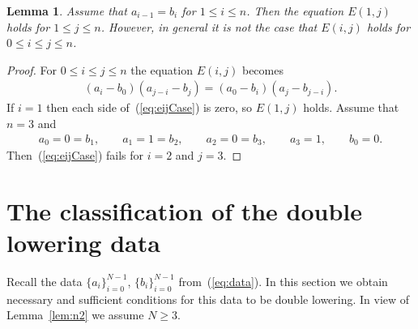 \documentclass[pdftex]{sigma}
\numberwithin{equation}{section}
\newtheorem{Lemma}[Theorem]{Lemma}
\begin{document}
\begin{Lemma}\label{lem:ce}
Assume that $a_{i-1}=b_i$ for $1 \leq i \leq n$.
Then the equation $E(1,j)$ holds for $1 \leq j \leq n$.
However, in general it is not the case that $E(i,j)$ holds
for $0 \leq i\leq j\leq n$.
\end{Lemma}
\begin{proof} For $0\leq i \leq j\leq n$ the equation
$E(i,j)$ becomes
\begin{gather}
(a_i-b_0)(a_{j-i}-b_j) =
(a_0-b_i)(a_{j}-b_{j-i}).
\label{eq:eijCase}
\end{gather}
If $i=1$ then each side of~(\ref{eq:eijCase}) is zero,
so $E(1,j)$ holds.
Assume that $n=3$ and
\begin{gather*}
a_0=0=b_1, \qquad a_1=1=b_2, \qquad a_2=0=b_3,\qquad a_3=1, \qquad b_0=0.
\end{gather*}
Then~(\ref{eq:eijCase}) fails for $i=2$ and $j=3$.
\end{proof}

\section{The classification of the double lowering data}\label{section12}

Recall the data
$\lbrace a_i\rbrace_{i=0}^{N-1}$,
$\lbrace b_i\rbrace_{i=0}^{N-1}$ from~(\ref{eq:data}). In this section we obtain
necessary and sufficient conditions for this
data to be double lowering.
In view of Lemma~\ref{lem:n2}
 we assume $N\geq 3$.
\end{document}
